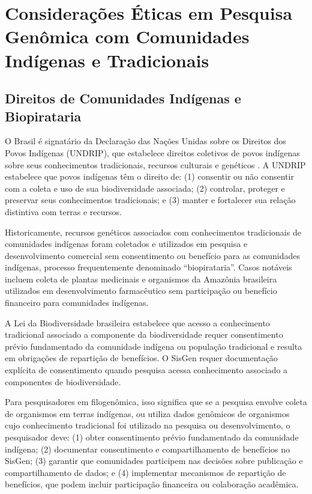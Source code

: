 \section{Considerações Éticas em Pesquisa Genômica com Comunidades Indígenas e Tradicionais}

\subsection{Direitos de Comunidades Indígenas e Biopirataria}

O Brasil é signatário da Declaração das Nações Unidas sobre os Direitos dos Povos Indígenas (UNDRIP), que estabelece direitos coletivos de povos indígenas sobre seus conhecimentos tradicionais, recursos culturais e genéticos \parencite{undrip2007}. A UNDRIP estabelece que povos indígenas têm o direito de: (1) consentir ou não consentir com a coleta e uso de sua biodiversidade associada; (2) controlar, proteger e preservar seus conhecimentos tradicionais; e (3) manter e fortalecer sua relação distintiva com terras e recursos.

Historicamente, recursos genéticos associados com conhecimentos tradicionais de comunidades indígenas foram coletados e utilizados em pesquisa e desenvolvimento comercial sem consentimento ou benefício para as comunidades indígenas, processo frequentemente denominado ``biopirataria''. Casos notáveis incluem coleta de plantas medicinais e organismos da Amazônia brasileira utilizados em desenvolvimento farmacêutico sem participação ou benefício financeiro para comunidades indígenas.

A Lei da Biodiversidade brasileira estabelece que acesso a conhecimento tradicional associado a componente da biodiversidade requer consentimento prévio fundamentado da comunidade indígena ou população tradicional e resulta em obrigações de repartição de benefícios. O SisGen requer documentação explícita de consentimento quando pesquisa acessa conhecimento associado a componentes de biodiversidade.

Para pesquisadores em filogenômica, isso significa que se a pesquisa envolve coleta de organismos em terras indígenas, ou utiliza dados genômicos de organismos cujo conhecimento tradicional foi utilizado na pesquisa ou desenvolvimento, o pesquisador deve: (1) obter consentimento prévio fundamentado da comunidade indígena; (2) documentar consentimento e compartilhamento de benefícios no SisGen; (3) garantir que comunidades participem nas decisões sobre publicação e compartilhamento de dados; e (4) implementar mecanismos de repartição de benefícios, que podem incluir participação financeira ou colaboração acadêmica.

